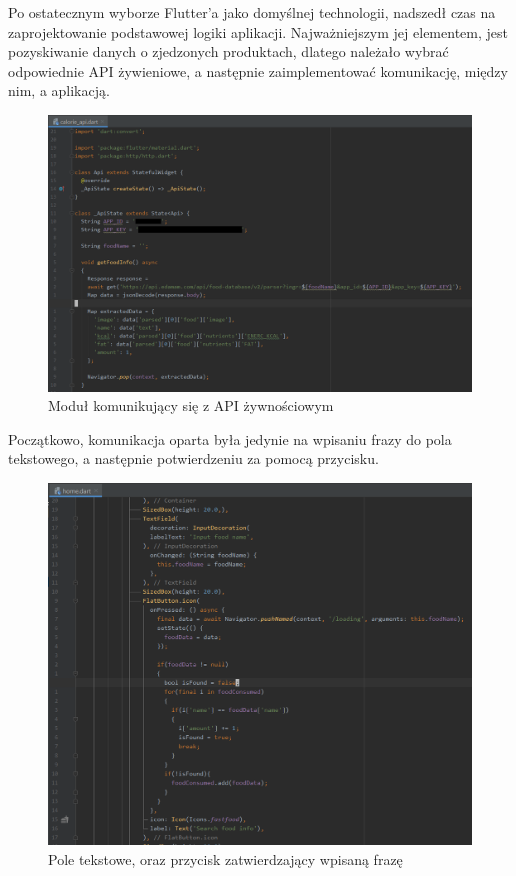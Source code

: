 \documentclass[12pt, a4paper]{article}
\begin{document}
\begin{sloppypar}
{  Po ostatecznym wyborze Flutter'a jako domyślnej technologii, nadszedł czas na
  zaprojektowanie podstawowej logiki aplikacji. Najważniejszym jej elementem, jest
  pozyskiwanie danych o zjedzonych produktach, dlatego należało wybrać odpowiednie API
  żywieniowe, a następnie zaimplementować komunikację, między nim, a aplikacją. 
  \begin{figure}[H]
    \centering
    \includegraphics[width=.9\textwidth]{app_dev_1.PNG}
    \caption{Moduł komunikujący się z API żywnościowym}
    \label{fig:app1}
  \end{figure}
  Początkowo, komunikacja oparta była jedynie na wpisaniu frazy do pola tekstowego, a
  następnie potwierdzeniu za pomocą przycisku. 
  \begin{figure}[H]
    \centering
    \includegraphics[width=.9\textwidth]{app_dev_2.PNG}
    \caption{Pole tekstowe, oraz przycisk zatwierdzający wpisaną frazę}

\end{figure}}
\end{sloppypar}
\end{document}
